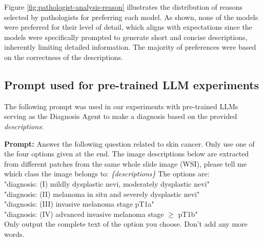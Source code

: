 

Figure \ref{fig:pathologist-analysis-reason} illustrates the distribution of reasons selected by pathologists for preferring each model. As shown, none of the models were preferred for their level of detail, which aligns with expectations since the models were specifically prompted to generate short and concise descriptions, inherently limiting detailed information. The majority of preferences were based on the correctness of the descriptions.



\subsection{Prompt used for pre-trained LLM experiments}
\label{supp:diagnosis-llm-prompting}
The following prompt was used in our experiments with pre-trained LLMs serving as the Diagnosis Agent to make a diagnosis based on the provided \textit{descriptions}:

\noindent\textbf{Prompt:} Answer the following question related to skin cancer. Only use one of the four options given at the end. \newline
The image descriptions below are extracted from different patches from the same whole slide image (WSI), please tell me which class the image belongs to:\newline
\textit{\{descriptions\}}\newline
The options are: \\
"diagnosis: (I) mildly dysplastic nevi, moderately dysplastic nevi"\\
"diagnosis: (II) melanoma in situ and severely dysplastic nevi"\\
"diagnosis: (III) invasive melanoma stage pT1a"\\
"diagnosis: (IV) advanced invasive melanoma stage $\geq$ pT1b"\\
Only output the complete text of the option you choose. Don't add any more words.
